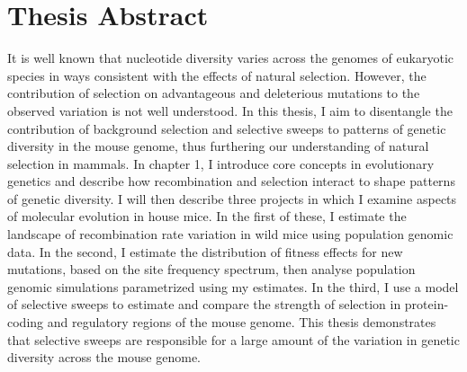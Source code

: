 
\chapter*{Thesis Abstract}

It is well known that nucleotide diversity varies across the genomes of eukaryotic species in ways consistent with the effects of natural selection. However, the contribution of selection on advantageous and deleterious mutations to the observed variation is not well understood. In this thesis, I aim to disentangle the contribution of background selection and selective sweeps to patterns of genetic diversity in the mouse genome, thus furthering our understanding of natural selection in mammals. In chapter 1, I introduce core concepts in evolutionary genetics and describe how recombination and selection interact to shape patterns of genetic diversity. I will then describe three projects in which I examine aspects of molecular evolution in house mice. In the first of these, I estimate the landscape of recombination rate variation in wild mice using population genomic data. In the second, I estimate the distribution of fitness effects for new mutations, based on the site frequency spectrum, then analyse population genomic simulations parametrized using my estimates. In the third, I use a model of selective sweeps to estimate and compare the strength of selection in protein-coding and regulatory regions of the mouse genome. This thesis demonstrates that selective sweeps are responsible for a large amount of the variation in genetic diversity across the mouse genome.